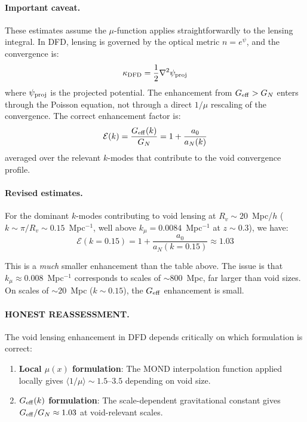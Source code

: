 \documentclass[11pt,a4paper]{article}
\newcommand{\Geff}{G_{\rm eff}}
\newcommand{\kmu}{k_\mu}
\begin{document}
\paragraph{Important caveat.}
These estimates assume the $\mu$-function applies straightforwardly
to the lensing integral.  In DFD, lensing is governed by the optical
metric $n = e^\psi$, and the convergence is:
\begin{equation}
\kappa_{\rm DFD} = \frac{1}{2}\nabla^2 \psi_{\rm proj}
\end{equation}
where $\psi_{\rm proj}$ is the projected potential.  The enhancement
from $\Geff > G_N$ enters through the Poisson equation, not through
a direct $1/\mu$ rescaling of the convergence.  The correct
enhancement factor is:
\begin{equation}
\mathcal{E}(k) = \frac{\Geff(k)}{G_N} = 1 + \frac{a_0}{a_N(k)}
\end{equation}
averaged over the relevant $k$-modes that contribute to the void
convergence profile.

\paragraph{Revised estimates.}
For the dominant $k$-modes contributing to void lensing at $R_v \sim 20$~Mpc/$h$
($k \sim \pi/R_v \sim 0.15$~Mpc$^{-1}$, well above $\kmu = 0.0084$~Mpc$^{-1}$
at $z \sim 0.3$), we have:
\begin{equation}
\mathcal{E}(k = 0.15) = 1 + \frac{a_0}{a_N(k=0.15)} \approx 1.03
\end{equation}

This is a \emph{much} smaller enhancement than the table above.
The issue is that $\kmu \approx 0.008$~Mpc$^{-1}$ corresponds to
scales of $\sim 800$~Mpc, far larger than void sizes.  On scales
of $\sim 20$~Mpc ($k \sim 0.15$), the $\Geff$ enhancement is small.

\paragraph{HONEST REASSESSMENT.}
The void lensing enhancement in DFD depends critically on which
formulation is correct:

\begin{enumerate}[label=(\alph*)]
\item \textbf{Local $\mu(x)$ formulation}: The MOND interpolation
  function applied locally gives $\langle 1/\mu \rangle \sim 1.5$--$3.5$
  depending on void size.
\item \textbf{$\Geff(k)$ formulation}: The scale-dependent gravitational
  constant gives $\Geff/G_N \approx 1.03$ at void-relevant scales.
\end{enumerate}
\end{document}
